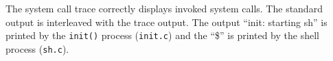 \documentclass[11pt,letterpaper]{report}
\begin{document}
\begin{enumerate}
\begin{figure}[h!]
                                                                                                                                                                                                                                                                                                                                                                                                                                                                                                                                                                                                \end{figure}
                                                                                                                                                                                                                                                                                                                                                                                                                                                                                                                                                                                                  
                                                                                                                                                                                                                                                                                                                                                                                                                                                                                                                                                                                                    The system call trace correctly displays invoked system calls. The standard output is interleaved with the trace output. The output ``init: starting sh'' is printed by the {\tt init()} process ({\tt init.c}) and the ``\$'' is printed by the shell process ({\tt sh.c}).
                                                                                                                                                                                                                                                                                                                                                                                                                                                                                                                                                                                                      

\end{enumerate}
\end{document}
